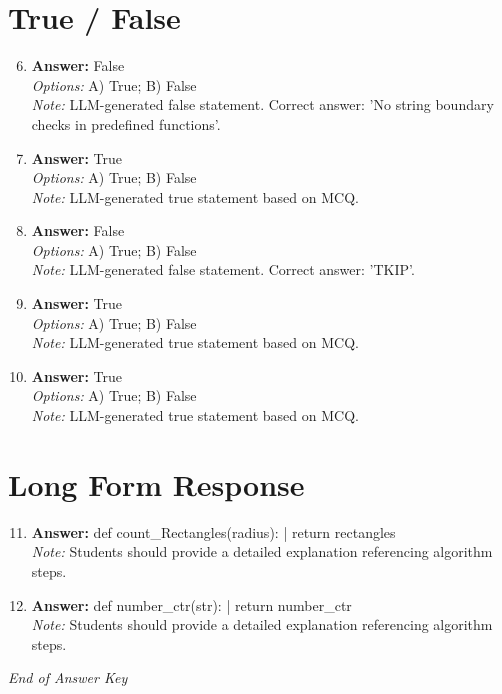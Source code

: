 \documentclass[12pt]{article}
\begin{document}
\section*{True / False}
\begin{enumerate}[label=\arabic*.]
\setcounter{enumi}{5}
\item \textbf{Answer:} False
\\ \textit{Options:} A) True; B) False
\\ \textit{Note:} LLM-generated false statement. Correct answer: 'No string boundary checks in predefined functions'.
\item \textbf{Answer:} True
\\ \textit{Options:} A) True; B) False
\\ \textit{Note:} LLM-generated true statement based on MCQ.
\item \textbf{Answer:} False
\\ \textit{Options:} A) True; B) False
\\ \textit{Note:} LLM-generated false statement. Correct answer: 'TKIP'.
\item \textbf{Answer:} True
\\ \textit{Options:} A) True; B) False
\\ \textit{Note:} LLM-generated true statement based on MCQ.
\item \textbf{Answer:} True
\\ \textit{Options:} A) True; B) False
\\ \textit{Note:} LLM-generated true statement based on MCQ.
\end{enumerate}

\section*{Long Form Response}
\begin{enumerate}[label=\arabic*.]
\setcounter{enumi}{10}
\item \textbf{Answer:} def count\_Rectangles(radius): | return rectangles
\\ \textit{Note:} Students should provide a detailed explanation referencing algorithm steps.
\item \textbf{Answer:} def number\_ctr(str): | return number\_ctr
\\ \textit{Note:} Students should provide a detailed explanation referencing algorithm steps.
\end{enumerate}

\vfill
\noindent\textit{End of Answer Key}
\end{document}
